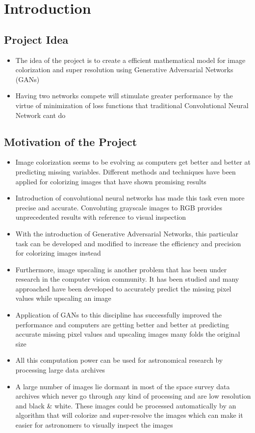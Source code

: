 \documentclass[oneside,a4paper,12pt]{report}
\begin{document}
\setlength{\parindent}{11mm}





\chapter{Introduction}
\section{Project Idea}
\begin{itemize}
\item The idea of the project is to create a efficient mathematical model for image colorization and super resolution using Generative Adversarial Networks (GANs)
\item Having two networks compete will stimulate greater performance by the virtue of minimization of loss functions that traditional Convolutional Neural Network cant do
\end{itemize}


\section{Motivation of the Project}
\begin{itemize}
\item Image colorization seems to be evolving as computers get better and better at predicting missing variables. Different methods and techniques have been applied for colorizing images that have shown promising results
\item Introduction of convolutional neural networks has made this task even more precise and accurate. Convoluting grayscale images to RGB provides unprecedented results with reference to visual inspection
\item With the introduction of Generative Adversarial Networks, this particular task can be developed and modified to increase the efficiency and precision for colorizing images instead
\item Furthermore, image upscaling is another problem that has been under research in the computer vision community. It has been studied and many approached have been developed to accurately predict the missing pixel values while upscaling an image
\item Application of GANs to this discipline has successfully improved the performance and computers are getting better and better at predicting accurate missing pixel values and upscaling images many folds the original size
\item All this computation power can be used for astronomical research by processing large data archives
\item A large number of images lie dormant in most of the space survey data archives which never go through any kind of processing and are low resolution and black \& white. These images could be processed automatically by an algorithm that will colorize and super-resolve the images which can make it easier for astronomers to visually inspect the images
\end{itemize}
\end{document}
